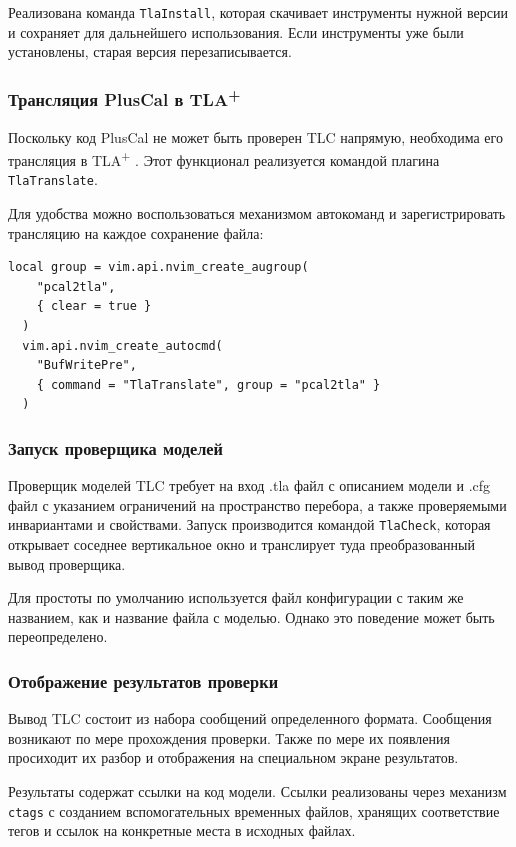 \documentclass[14pt, openany]{report}
\newcommand{\tlapl}{TLA\textsuperscript{+} }
\newcommand{\prog}[1]{\lstinline[style=progStyle]{#1}}
\begin{document}
Реализована команда \prog{TlaInstall}, которая скачивает инструменты нужной версии и сохраняет для дальнейшего использования. Если инструменты уже были установлены, старая версия перезаписывается.

\subsubsection{Трансляция PlusCal в \tlapl}
Поскольку код PlusCal не может быть проверен TLC напрямую, необходима его трансляция в \tlapl. Этот функционал реализуется командой плагина \prog{TlaTranslate}. 

Для удобства можно воспользоваться механизмом автокоманд и зарегистрировать трансляцию на каждое сохранение файла:
\begin{lstlisting}[label=listing:pcalAutocmd, caption=Автоматическая трансляция PlusCal, captionpos=b, style=progStyle]
  local group = vim.api.nvim_create_augroup(
    "pcal2tla",
    { clear = true }
  )
  vim.api.nvim_create_autocmd(
    "BufWritePre",
    { command = "TlaTranslate", group = "pcal2tla" }
  )
\end{lstlisting}

\subsubsection{Запуск проверщика моделей}
Проверщик моделей TLC требует на вход .tla файл с описанием модели и .cfg файл с указанием ограничений на пространство перебора, а также проверяемыми инвариантами и свойствами. Запуск производится командой \prog{TlaCheck}, которая открывает соседнее вертикальное окно и транслирует туда преобразованный вывод проверщика.

Для простоты по умолчанию используется файл конфигурации с таким же названием, как и название файла с моделью. Однако это поведение может быть переопределено.

\subsubsection{Отображение результатов проверки}
Вывод TLC состоит из набора сообщений определенного формата. Сообщения возникают по мере прохождения проверки. Также по мере их появления просиходит их разбор и отображения на специальном экране результатов.

Результаты содержат ссылки на код модели. Ссылки реализованы через механизм \prog{ctags} с созданием вспомогательных временных файлов, хранящих соответствие тегов и ссылок на конкретные места в исходных файлах.
\end{document}
